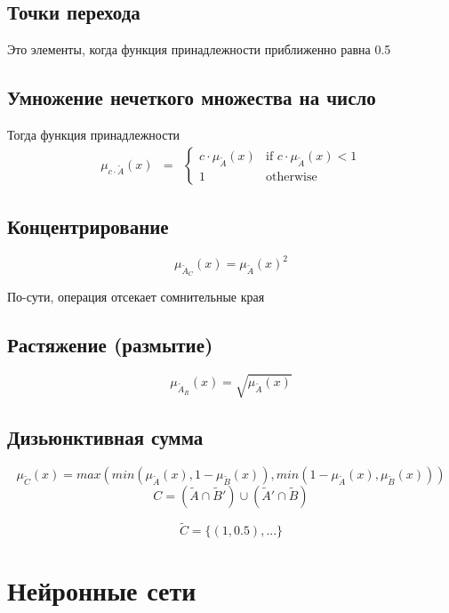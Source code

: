 		\subsection{Точки перехода}
			Это элементы, когда функция принадлежности приближенно равна 0.5
		
		\subsection{Умножение нечеткого множества на число}
			Тогда функция принадлежности 
			\begin{equation}
                \begin{matrix}
                \mu_{c \cdot \tilde A}(x) & =
                & \left\{
                \begin{matrix}
                c \cdot \mu_{\tilde A}(x) & \mbox{if } c \cdot \mu_{\tilde A}(x) < 1\\
                1 & \mbox{otherwise }
                \end{matrix} \right.
                \end{matrix}
            \end{equation}
				
		\subsection{Концентрирование} 
			\[\mu_{\tilde A_C}(x) = \mu_{\tilde A}(x)^2\]
			
			По-сути, операция отсекает сомнительные края
			
		\subsection{Растяжение (размытие)}
			\[\mu_{\tilde A_R}(x) = \sqrt{\mu_{\tilde A}(x)}\]
			
		\subsection{Дизьюнктивная сумма}
			\[\mu_{\tilde C}(x) = max(min(\mu_{\tilde A}(x), 1 - \mu_{\tilde B}(x)), min(1 - \mu_{\tilde A}(x), \mu_{\tilde B}(x)))\]
			\[C = (\tilde A \cap \tilde B') \cup (\tilde A' \cap \tilde B)\]
			
			\[\tilde C = \{(1, 0.5), ...\}\]
	\section{Нейронные сети}
